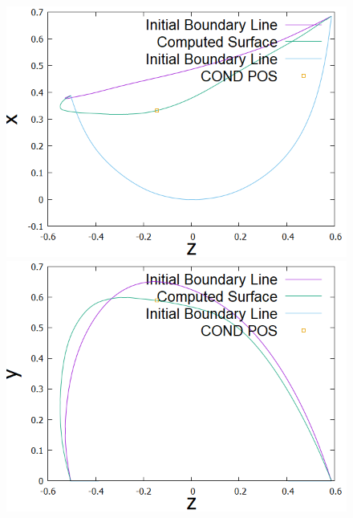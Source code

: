 \documentclass[16.7pt]{jsarticle}
\begin{document}
	\begin{figure}[h]
		\centering
		\begin{minipage}{0.45\hsize}
			\centering
			\includegraphics[scale = 0.3]{./figure/05Minus/ObtainedRidgeLinefromz-x.png}
		\end{minipage}
		\begin{minipage}{0.45\hsize}
			\centering
			\includegraphics[scale = 0.3]{./figure/05Minus/ObtainedRidgeLinefromz-y.png}
		\end{minipage}
	\end{figure}
\end{document}
